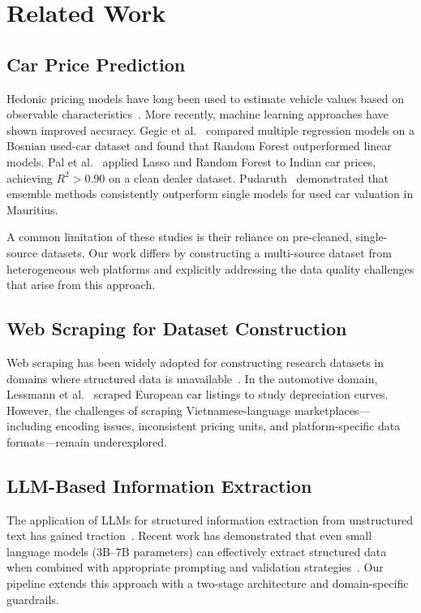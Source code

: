 \documentclass[lettersize,journal]{IEEEtran}
\begin{document}
\section{Related Work}

\subsection{Car Price Prediction}
Hedonic pricing models have long been used to estimate vehicle values based
on observable characteristics~\cite{hedonic_pricing}. More recently, machine
learning approaches have shown improved accuracy. Gegic et al.~\cite{gegic2019}
compared multiple regression models on a Bosnian used-car dataset and found
that Random Forest outperformed linear models. Pal et al.~\cite{pal2018}
applied Lasso and Random Forest to Indian car prices, achieving $R^2 > 0.90$
on a clean dealer dataset. Pudaruth~\cite{pudaruth2014} demonstrated that
ensemble methods consistently outperform single models for used car valuation
in Mauritius.

A common limitation of these studies is their reliance on pre-cleaned,
single-source datasets. Our work differs by constructing a multi-source
dataset from heterogeneous web platforms and explicitly addressing the data
quality challenges that arise from this approach.

\subsection{Web Scraping for Dataset Construction}
Web scraping has been widely adopted for constructing research datasets in
domains where structured data is unavailable~\cite{mitchell_scraping}. In the
automotive domain, Lessmann et al.~\cite{lessmann2019} scraped European car
listings to study depreciation curves. However, the challenges of scraping
Vietnamese-language marketplaces---including encoding issues, inconsistent
pricing units, and platform-specific data formats---remain underexplored.

\subsection{LLM-Based Information Extraction}
The application of LLMs for structured information extraction from
unstructured text has gained traction~\cite{wei2023}. Recent work has
demonstrated that even small language models (3B--7B parameters) can
effectively extract structured data when combined with appropriate prompting
and validation strategies~\cite{ollama2024}. Our pipeline extends this
approach with a two-stage architecture and domain-specific guardrails.
\end{document}
